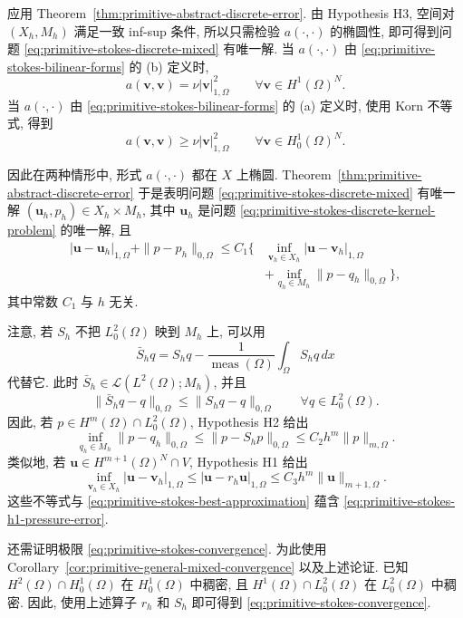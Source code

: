 \begin{Proof}
应用 Theorem~\ref{thm:primitive-abstract-discrete-error}.
由 Hypothesis H3, 空间对 $(X_h,M_h)$ 满足一致 inf-sup 条件,
所以只需检验 $a(\cdot,\cdot)$ 的椭圆性, 即可得到问题
\eqref{eq:primitive-stokes-discrete-mixed} 有唯一解.
当 $a(\cdot,\cdot)$ 由 \eqref{eq:primitive-stokes-bilinear-forms} 的 (b) 定义时,
\[
a(\mathbf v,\mathbf v)=\nu|\mathbf v|_{1,\Omega}^2
\qquad\forall\mathbf v\in H^1(\Omega)^N.
\]
当 $a(\cdot,\cdot)$ 由 \eqref{eq:primitive-stokes-bilinear-forms} 的 (a) 定义时,
使用 Korn 不等式, 得到
\[
a(\mathbf v,\mathbf v)\geq\nu|\mathbf v|_{1,\Omega}^2
\qquad\forall\mathbf v\in H_0^1(\Omega)^N.
\]

因此在两种情形中, 形式 $a(\cdot,\cdot)$ 都在 $X$ 上椭圆.
Theorem~\ref{thm:primitive-abstract-discrete-error} 于是表明问题
\eqref{eq:primitive-stokes-discrete-mixed} 有唯一解
$(\mathbf u_h,p_h)\in X_h\times M_h$, 其中 $\mathbf u_h$ 是问题
\eqref{eq:primitive-stokes-discrete-kernel-problem} 的唯一解, 且
\begin{equation}\label{eq:primitive-stokes-best-approximation}
\begin{split}
|\mathbf u-\mathbf u_h|_{1,\Omega}+\|p-p_h\|_{0,\Omega}
\leq C_1\biggl\{&
\inf_{\mathbf v_h\in X_h}|\mathbf u-\mathbf v_h|_{1,\Omega}\\
&+\inf_{q_h\in M_h}\|p-q_h\|_{0,\Omega}
\biggr\},
\end{split}
\end{equation}
其中常数 $C_1$ 与 $h$ 无关.

注意, 若 $S_h$ 不把 $L_0^2(\Omega)$ 映到 $M_h$ 上, 可以用
\[
\bar S_hq=S_hq-\frac{1}{\operatorname{meas}(\Omega)}
\int_\Omega S_hq\,dx
\]
代替它. 此时 $\bar S_h\in\mathcal L(L^2(\Omega);M_h)$, 并且
\[
\|\bar S_hq-q\|_{0,\Omega}\leq\|S_hq-q\|_{0,\Omega}
\qquad\forall q\in L_0^2(\Omega).
\]
因此, 若 $p\in H^m(\Omega)\cap L_0^2(\Omega)$, Hypothesis H2 给出
\[
\inf_{q_h\in M_h}\|p-q_h\|_{0,\Omega}
\leq\|p-S_hp\|_{0,\Omega}
\leq C_2h^m\|p\|_{m,\Omega}.
\]
类似地, 若 $\mathbf u\in H^{m+1}(\Omega)^N\cap V$, Hypothesis H1 给出
\[
\inf_{\mathbf v_h\in X_h}|\mathbf u-\mathbf v_h|_{1,\Omega}
\leq|\mathbf u-r_h\mathbf u|_{1,\Omega}
\leq C_3h^m\|\mathbf u\|_{m+1,\Omega}.
\]
这些不等式与 \eqref{eq:primitive-stokes-best-approximation} 蕴含
\eqref{eq:primitive-stokes-h1-pressure-error}.

还需证明极限 \eqref{eq:primitive-stokes-convergence}. 为此使用
Corollary~\ref{cor:primitive-general-mixed-convergence} 以及上述论证.
已知 $H^2(\Omega)\cap H_0^1(\Omega)$ 在 $H_0^1(\Omega)$ 中稠密,
且 $H^1(\Omega)\cap L_0^2(\Omega)$ 在 $L_0^2(\Omega)$ 中稠密.
因此, 使用上述算子 $r_h$ 和 $S_h$ 即可得到
\eqref{eq:primitive-stokes-convergence}.
\end{Proof}

